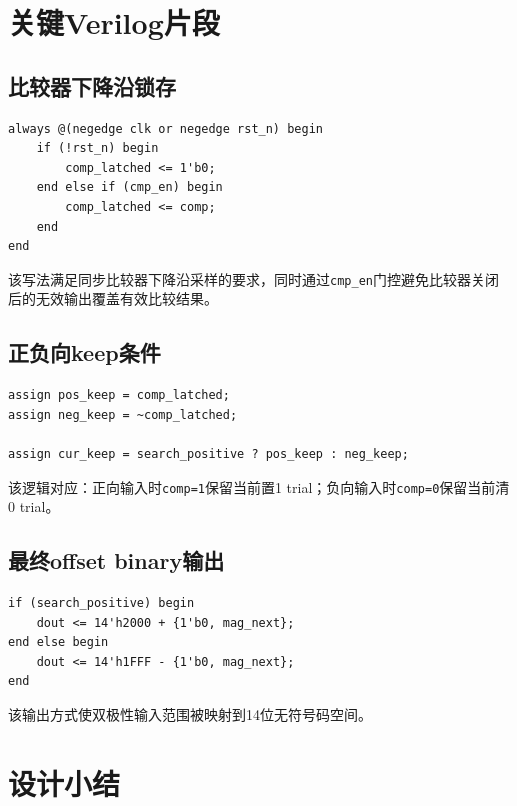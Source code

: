 \section{关键Verilog片段}

\subsection{比较器下降沿锁存}

\begin{lstlisting}[style=verilogstyle]
always @(negedge clk or negedge rst_n) begin
    if (!rst_n) begin
        comp_latched <= 1'b0;
    end else if (cmp_en) begin
        comp_latched <= comp;
    end
end
\end{lstlisting}
该写法满足同步比较器下降沿采样的要求，同时通过\texttt{cmp\_en}门控避免比较器关闭后的无效输出覆盖有效比较结果。

\subsection{正负向keep条件}

\begin{lstlisting}[style=verilogstyle]
assign pos_keep = comp_latched;
assign neg_keep = ~comp_latched;

assign cur_keep = search_positive ? pos_keep : neg_keep;
\end{lstlisting}
该逻辑对应：正向输入时\texttt{comp=1}保留当前置1 trial；负向输入时\texttt{comp=0}保留当前清0 trial。

\subsection{最终offset binary输出}

\begin{lstlisting}[style=verilogstyle]
if (search_positive) begin
    dout <= 14'h2000 + {1'b0, mag_next};
end else begin
    dout <= 14'h1FFF - {1'b0, mag_next};
end
\end{lstlisting}
该输出方式使双极性输入范围被映射到14位无符号码空间。

\section{设计小结}

